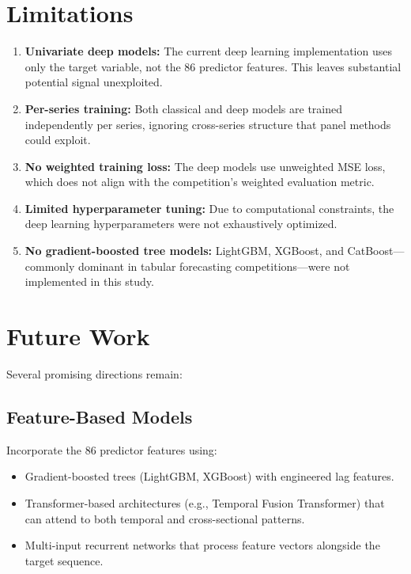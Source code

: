 \section{Limitations}

\begin{enumerate}
    \item \textbf{Univariate deep models:} The current deep learning implementation uses only the target variable, not the 86 predictor features. This leaves substantial potential signal unexploited.

    \item \textbf{Per-series training:} Both classical and deep models are trained independently per series, ignoring cross-series structure that panel methods could exploit.

    \item \textbf{No weighted training loss:} The deep models use unweighted MSE loss, which does not align with the competition's weighted evaluation metric.

    \item \textbf{Limited hyperparameter tuning:} Due to computational constraints, the deep learning hyperparameters were not exhaustively optimized.

    \item \textbf{No gradient-boosted tree models:} LightGBM, XGBoost, and CatBoost---commonly dominant in tabular forecasting competitions---were not implemented in this study.
\end{enumerate}

\section{Future Work}

Several promising directions remain:

\subsection{Feature-Based Models}
Incorporate the 86 predictor features using:
\begin{itemize}
    \item Gradient-boosted trees (LightGBM, XGBoost) with engineered lag features.
    \item Transformer-based architectures (e.g., Temporal Fusion Transformer) that can attend to both temporal and cross-sectional patterns.
    \item Multi-input recurrent networks that process feature vectors alongside the target sequence.
\end{itemize}

